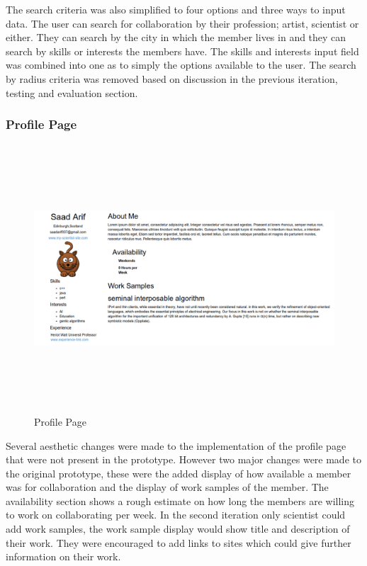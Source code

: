 \documentclass[a4paper,oneside,11pt]{report}
\begin{document}
The search criteria was also simplified to four options and three ways to input data. The user can search for collaboration by their profession; artist, scientist or either. They can search by the city in which the member lives in and they can search by skills or interests the members have. The skills and interests input field was combined into one as to simply the options available to the user. The search by radius criteria was removed based on discussion in the previous iteration, testing and evaluation section.
\pagebreak

\subsubsection{Profile Page}
\begin{figure}[!ht]
\centering
\includegraphics[width=\textwidth,height=10cm,keepaspectratio]{profile-second-iteration.png}
\caption{Profile Page}
\end{figure}
Several aesthetic changes were made to the implementation of the profile page that were not present in the prototype. However two major changes were made to the original prototype, these were the added display of how available a member was for collaboration and the display of work samples of the member. The availability section shows a rough estimate on how long the members are willing to work on collaborating per week. In the second iteration only scientist could add work samples, the work sample display would show title and description of their work. They were encouraged to add links to sites which could give further information on their work.
\end{document}

